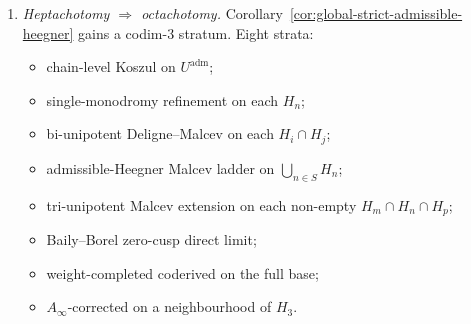 \begin{theorem}
\begin{enumerate}[label=\textup{(\alph*)}]
CKS~\cite[Thm.~3.3, \S 3.7]{CattaniKaplanSchmid1986} extends
$(N_m,N_n,N_p)$ uniquely to three pairwise commuting
$\mathfrak{sl}_2$-triples with
$[N_i,N_j]=[N_i,N_j^+]=[Y_i,Y_j]=0$ for $i\neq j$. The tri-isotypic
chain homotopy
\begin{equation}
\label{eq:tri-unipotent-chain-homotopy}
h^{\{\chi_i,k_i\}_{i=m,n,p}}_{\mathrm{tri}}
\;:=\;
\prod_{i}M^{(\chi_i)}_{H_i}
\circ\Bigl(\textstyle\sum_{i}N_i+\lambda_{\{k_i\}}\mathrm{id}\Bigr)^{-1}
\circ(\mathrm{id}+\sigma h^{(g)})^{-1}\circ\sigma
\end{equation}
satisfies
$[d^{\mathrm{tri}}_{\mathrm{bar}},h^{\mathrm{tri}}]
=\mathrm{id}-p^{\mathrm{tri}}$ with
$p^{\mathrm{tri}}=\prod_i p^{\Gamma}_{H_i}$.
\item \emph{Heptachotomy $\Rightarrow$ octachotomy.}
Corollary~\textup{\ref{cor:global-strict-admissible-heegner}} gains a
codim-$3$ stratum. Eight strata:
\begin{itemize}
\item chain-level Koszul on $U^{\mathrm{adm}}$;
\item single-monodromy refinement on each $H_n$;
\item bi-unipotent Deligne--Malcev on each $H_i\cap H_j$;
\item admissible-Heegner Malcev ladder on $\bigcup_{n\in S}H_n$;
\item tri-unipotent Malcev extension on each non-empty
$H_m\cap H_n\cap H_p$;
\item Baily--Borel zero-cusp direct limit;
\item weight-completed coderived on the full base;
\item $A_\infty$-corrected on a neighbourhood of $H_3$.
\end{itemize}
\end{enumerate}
\end{theorem}

